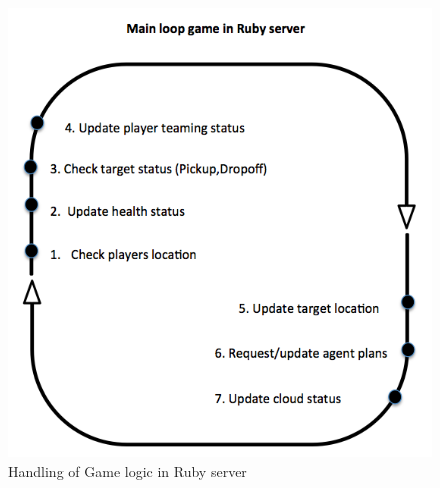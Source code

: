 \begin{figure}[H]
  \centering
  \includegraphics[width=1\textwidth]{img/Appendix/Mainloop}
  \caption{Handling of Game logic in Ruby server}
\end{figure}

